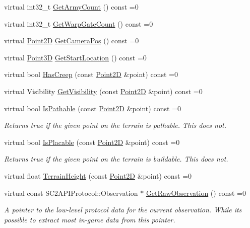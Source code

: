 \begin{DoxyCompactItemize}
\item 
virtual int32\+\_\+t \hyperlink{classsc2_1_1_observation_interface_a1ab99209855a20aae751684e1af19aaa}{Get\+Army\+Count} () const =0
\item 
virtual int32\+\_\+t \hyperlink{classsc2_1_1_observation_interface_ade7028b262089975621a18c54d4cddb3}{Get\+Warp\+Gate\+Count} () const =0
\item 
virtual \hyperlink{structsc2_1_1_point2_d}{Point2D} \hyperlink{classsc2_1_1_observation_interface_ae0415e17a101e959a412e97f5db39358}{Get\+Camera\+Pos} () const =0
\item 
virtual \hyperlink{structsc2_1_1_point3_d}{Point3D} \hyperlink{classsc2_1_1_observation_interface_a67b41bf8b933702e2d83db5f7f2095f3}{Get\+Start\+Location} () const =0
\item 
virtual bool \hyperlink{classsc2_1_1_observation_interface_a155ebc1b654779ca8bd489d13d91d57c}{Has\+Creep} (const \hyperlink{structsc2_1_1_point2_d}{Point2D} \&point) const =0
\item 
virtual Visibility \hyperlink{classsc2_1_1_observation_interface_ab17337d7e05f1e9cf80252da10f01b04}{Get\+Visibility} (const \hyperlink{structsc2_1_1_point2_d}{Point2D} \&point) const =0
\item 
virtual bool \hyperlink{classsc2_1_1_observation_interface_a09ba9ccd3b9c32a6e57d80da3e739a49}{Is\+Pathable} (const \hyperlink{structsc2_1_1_point2_d}{Point2D} \&point) const =0
\begin{DoxyCompactList}\small\item\em Returns \textquotesingle{}true\textquotesingle{} if the given point on the terrain is pathable. This does not. \end{DoxyCompactList}\item 
virtual bool \hyperlink{classsc2_1_1_observation_interface_aceb3be53ab7a68e268169e6f786e61f6}{Is\+Placable} (const \hyperlink{structsc2_1_1_point2_d}{Point2D} \&point) const =0
\begin{DoxyCompactList}\small\item\em Returns \textquotesingle{}true\textquotesingle{} if the given point on the terrain is buildable. This does not. \end{DoxyCompactList}\item 
virtual float \hyperlink{classsc2_1_1_observation_interface_a8e6d0c2bce48f675b3d4b99f925dfafb}{Terrain\+Height} (const \hyperlink{structsc2_1_1_point2_d}{Point2D} \&point) const =0
\item 
virtual const S\+C2\+A\+P\+I\+Protocol\+::\+Observation $\ast$ \hyperlink{classsc2_1_1_observation_interface_a375edbd0639c948d8c83bdcd4ebd4932}{Get\+Raw\+Observation} () const =0
\begin{DoxyCompactList}\small\item\em A pointer to the low-\/level protocol data for the current observation. While it\textquotesingle{}s possible to extract most in-\/game data from this pointer. \end{DoxyCompactList}\end{DoxyCompactItemize}


